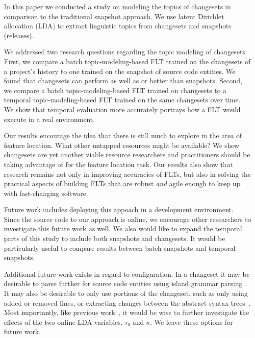
In this paper we conducted a study on modeling the topics of changesets in
comparison to the traditional snapshot approach.  We use latent Dirichlet
allocation (LDA) to extract linguistic topics from changesets and snapshots
(releases).

We addressed two research questions regarding the topic modeling of changesets.
First, we compare a batch topic-modeling-based FLT trained on the changesets of
a project's history to one trained on the snapshot of source code entities.  We
found that changesets can perform as well as or better than snapshots.  Second,
we compare a batch topic-modeling-based FLT trained on changesets to a temporal
topic-modeling-based FLT trained on the same changesets over time.  We show that
temporal evaluation more accurately portrays how a FLT would execute in a real
environment.

Our results encourage the idea that there is still much to explore in the area
of feature location. What other untapped resources might be available? We show
changesets are yet another viable resource researchers and practitioners should
be taking advantage of for the feature location task.  Our results also show
that research remains not only in improving accuracies of FLTs, but also in
solving the practical aspects of building FLTs that are robust \emph{and} agile
enough to keep up with fast-changing software.

Future work includes deploying this appoach in a development environment.  Since
the source code to our approach is online, we encourage other researchers to
investigate this future work as well.  We also would like to expand the temporal
parts of this study to include both snapshots and changesets.  It would be
particularly useful to compare results between batch snapshots and temporal
snapshots. 

Additional future work exists in regard to configuration. In a changeset
it may be desirable to parse further for source code entities using
island grammar parsing~\cite{Moonen:2001}.  It may also be desirable to
only use portions of the changeset, such as only using added or removed
lines, or extracting changes between the abstract syntax
trees~\cite{Fluri-etal:2007}. Most importantly, like previous
work~\cite{Biggers-etal:2014}, it would be wise to further investigate
the effects of the two online LDA variables, $\tau_0$ and $\kappa$.  We
leave these options for future work.

